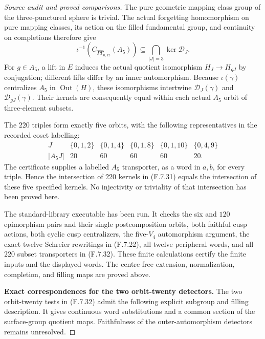 \begin{proof}[Source audit and proved comparisons]
The pure geometric mapping class group of the
three-punctured sphere is trivial.  The actual
forgetting homomorphism on pure mapping classes,
its action on the filled fundamental group, and
continuity on completions therefore give
\[
 \iota^{-1}\!\left(
       C_{\widehat{P\Gamma}_{0,12}}(A_5)\right)
               \subseteq\bigcap_{|J|=3}\ker\mathcal D_J.
                                                               \tag{F.7.31}
\]
For $g\in A_5$, a lift in $E$ induces the actual
quotient isomorphism $H_J\to H_{gJ}$ by conjugation;
different lifts differ by an inner automorphism.
Because $\iota(\gamma)$ centralizes $A_5$ in
$\operatorname{Out}(H)$, these isomorphisms intertwine
$\mathcal D_J(\gamma)$ and $\mathcal D_{gJ}(\gamma)$.
Their kernels are consequently equal within each
actual $A_5$ orbit of three-element subsets.

The $220$ triples form exactly five orbits, with
the following representatives in the recorded coset
labelling:
\[
 \begin{array}{c|ccccc}
 J&\{0,1,2\}&\{0,1,4\}&\{0,1,8\}&\{0,1,10\}&\{0,4,9\}\\
 |A_5J|&20&60&60&60&20 .
 \end{array}                                             \tag{F.7.32}
\]
The certificate supplies a labelled $A_5$ transporter,
as a word in $a,b$, for every triple.  Hence the
intersection of $220$ kernels in (F.7.31) equals the
intersection of these five specified kernels.
No injectivity or triviality of that intersection
has been proved here.

The standard-library executable
 has been run.
It checks the six and $120$ epimorphism pairs and
their single postcomposition orbits, both faithful
cusp actions, both cyclic cusp centralizers, the
five-$V_4$ automorphism argument, the exact twelve
Schreier rewritings in (F.7.22), all twelve peripheral
words, and all $220$ subset transporters in (F.7.32).
These finite calculations certify the finite inputs
and the displayed words.  The centre-free extension,
normalization, completion, and filling maps are
proved above.


\medskip\noindent\textbf{Exact correspondences for the two orbit-twenty detectors.}
The two orbit-twenty tests in (F.7.32) admit the following
explicit subgroup and filling description. It gives
continuous word substitutions and a common section of
the surface-group quotient maps. Faithfulness of the
outer-automorphism detectors remains unresolved.


\end{proof}
